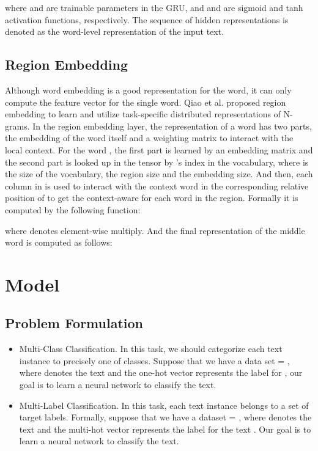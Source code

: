 \documentclass[letterpaper]{article} \usepackage{aaai19}  \usepackage{times}  \usepackage{helvet}  \usepackage{courier}  \usepackage{url}  \usepackage{graphicx}
\begin{document}
where  and  are trainable parameters in the GRU, and  and  are sigmoid and tanh activation functions, respectively.
The sequence of hidden representations  is denoted as the word-level representation of the input text.

\subsection{Region Embedding}
Although word embedding is a good representation for the word, it can only compute the feature vector for the single word. Qiao et al.  proposed region embedding to learn and utilize task-specific distributed representations of N-grams. In the region embedding layer, the representation of a word has two
parts, the embedding of the word itself and a weighting matrix to interact with the local context. For the word , the first part  is learned by an embedding matrix  and the second part  is looked up in the tensor  by 's index in the vocabulary, where  is the size of the vocabulary,  the region size and  the embedding size. And then, each column in  is used to interact with the context word in the corresponding relative position of  to get the context-aware  for each word  in the region. Formally it is computed by the following function:

where  denotes element-wise multiply.
And the final representation  of the middle word  is computed as follows:


\section{Model}
\subsection{Problem Formulation}
\begin{itemize}
\item Multi-Class Classification. 
In this task, we should categorize each text instance to precisely one of  classes. Suppose that we have a data set  = , where  denotes the text and the one-hot vector  represents the label for , our goal is to learn a neural network  to classify the text.
\item Multi-Label Classification. 
In this task, each text instance belongs to a set of  target labels. Formally, suppose that we have a dataset  = , where  denotes the text and the multi-hot vector  represents the label for the text . Our goal is to learn a neural network  to classify the text. 
\end{itemize}
\end{document}
